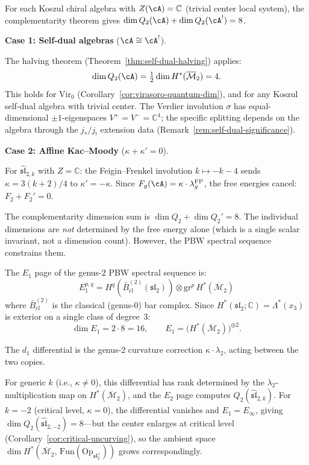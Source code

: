 \begin{computation}%
\label{comp:genus2-complementarity-table}
For each Koszul chiral algebra with $Z(\cA) = \mathbb{C}$
(trivial center local system), the complementarity
theorem gives $\dim Q_2(\cA) + \dim Q_2(\cA^!) = 8$.

\smallskip
\noindent\textbf{Case 1: Self-dual algebras} ($\cA \cong \cA^!$).

The halving theorem (Theorem~\ref{thm:self-dual-halving}) applies:
\begin{equation}\label{eq:genus2-self-dual-dims}
\dim Q_2(\cA) = \tfrac{1}{2}\dim H^*(\overline{\mathcal{M}}_2) = 4.
\end{equation}
This holds for
$\mathrm{Vir}_0$ (Corollary~\ref{cor:virasoro-quantum-dim}),
and for any Koszul self-dual algebra with trivial center.
The Verdier involution $\sigma$ has equal-dimensional $\pm 1$-eigenspaces
$V^+ = V^- = \mathbb{C}^4$; the specific splitting depends on the
algebra through the $j_*/j_!$ extension data
(Remark~\ref{rem:self-dual-significance}).

\smallskip
\noindent\textbf{Case 2: Affine Kac--Moody} ($\kappa + \kappa' = 0$).

For $\widehat{\mathfrak{sl}}_{2,k}$ with $Z = \mathbb{C}$:
the Feigin--Frenkel involution $k \mapsto -k-4$ sends
$\kappa = 3(k+2)/4$ to $\kappa' = -\kappa$.  Since
$F_g(\cA) = \kappa \cdot \lambda_g^{\mathrm{FP}}$, the free
energies cancel: $F_2 + F_2' = 0$.

The complementarity dimension sum is $\dim Q_2 + \dim Q_2' = 8$.
The individual dimensions are \emph{not} determined by the free
energy alone (which is a single scalar invariant, not a dimension
count).  However, the PBW spectral sequence constrains them.

The $E_1$ page of the genus-$2$ PBW spectral sequence is:
\[
E_1^{p,q} = H^q(\bar{B}^{(2)}_{\mathrm{cl}}(\mathfrak{sl}_2))
\otimes \mathrm{gr}^p \, H^*(\overline{\mathcal{M}}_2)
\]
where $\bar{B}^{(2)}_{\mathrm{cl}}$ is the classical (genus-$0$) bar
complex.  Since $H^*(\mathfrak{sl}_2;\mathbb{C}) =
\Lambda^*(x_3)$ is exterior on a single class of degree~$3$:
\[
\dim E_1 = 2 \cdot 8 = 16, \qquad
E_1 = \bigl(H^*(\overline{\mathcal{M}}_2)\bigr)^{\oplus 2}.
\]

The $d_1$ differential is the genus-$2$ curvature correction
$\kappa \cdot \lambda_2$, acting between the two copies.

For generic $k$ (i.e., $\kappa \neq 0$), this differential
has rank determined by the $\lambda_2$-multiplication map on
$H^*(\overline{\mathcal{M}}_2)$, and the $E_2$ page computes
$Q_2(\widehat{\mathfrak{sl}}_{2,k})$.  For $k = -2$ (critical level,
$\kappa = 0$), the differential vanishes and $E_1 = E_\infty$, giving
$\dim Q_2(\widehat{\mathfrak{sl}}_{2,-2}) = 8$---but the center
enlarges at critical level
(Corollary~\ref{cor:critical-uncurving}), so the ambient space
$\dim H^*(\overline{\mathcal{M}}_2,\,
\mathrm{Fun}(\mathrm{Op}_{\mathfrak{sl}_2^\vee}))$
grows correspondingly.


\end{computation}
